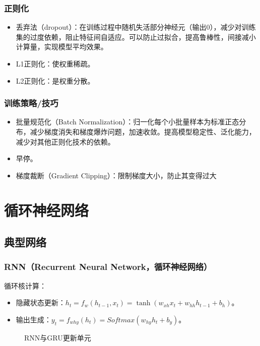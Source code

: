 \documentclass[
12pt, %
a4paper, 
oneside, %
headinclude,footinclude, %
]{scrartcl}
\begin{document}
\subsubsection[正则化]{正则化}
\begin{itemize}
\item 丢弃法（dropout）：在训练过程中随机失活部分神经元（输出$ 0 $），减少对训练集的过度依赖，阻止特征间自适应。可以防止过拟合，提高鲁棒性，间接减小计算量，实现模型平均效果。
\item L1正则化：使权重稀疏。
\item L2正则化：是权重分散。
\end{itemize}
\subsubsection[训练策略/技巧]{训练策略/技巧}
\begin{itemize}
\item 批量规范化（Batch Normalization）：归一化每个小批量样本为标准正态分布，减少梯度消失和梯度爆炸问题，加速收敛。提高模型稳定性、泛化能力，减少对其他正则化技术的依赖。
\item 早停。
\item 梯度裁断（Gradient Clipping）：限制梯度大小，防止其变得过大
\end{itemize}
\section{循环神经网络}
\subsection[典型网络]{典型网络}
\subsubsection[RNN]{RNN（Recurrent Neural Network，循环神经网络）}
循环核计算：
\begin{itemize}
\item 隐藏状态更新：$ h_t = f_w(h_{t - 1}, x_t) = \tanh(w_{xh}x_t + w_{hh}h_{t - 1} + b_h) $。
\item 输出生成：$ y_t = f_{why}(h_t) = Softmax(w_{hy}h_t + b_y) $。
\end{itemize}

\begin{figure}[H]
\centering
{} \quad
{} 
\caption{RNN与GRU更新单元}
\end{figure}
\end{document}
